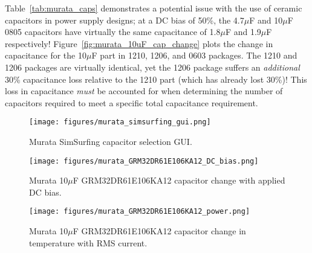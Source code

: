 \documentclass[10pt,twoside]{article}
\begin{document}
Table~\ref{tab:murata_caps} demonstrates a potential issue with the
use of ceramic capacitors in power supply designs; at a DC bias of
50\%, the 4.7$\mu$F and 10$\mu$F 0805 capacitors have virtually the
same capacitance of 1.8$\mu$F and 1.9$\mu$F respectively!
Figure~\ref{fig:murata_10uF_cap_change} plots the change in capacitance
for the 10$\mu$F part in 1210, 1206, and 0603 packages.
The 1210 and 1206 packages are virtually identical, yet the
1206 package suffers an {\em additional} 30\% capacitance
loss relative to the 1210 part (which has already lost 30\%)!
This loss in capacitance {\em must} be accounted for when determining
the number of capacitors required to meet a specific total capacitance
requirement.

%
\begin{figure}[p]
  \begin{center}
    \texttt{[image: figures/murata\_simsurfing\_gui.png]}\\
  \end{center}
  \caption{Murata SimSurfing capacitor selection GUI.}
  \label{fig:murata_simsurfing_cap_selector}
\end{figure}

%
%
\begin{figure}[p]
  \begin{center}
    \texttt{[image: figures/murata\_GRM32DR61E106KA12\_DC\_bias.png]}
  \end{center}
  \caption{Murata 10$\mu$F GRM32DR61E106KA12 capacitor change with applied DC bias.}
  \label{fig:murata_DC_bias}
\end{figure}

\begin{figure}[p]
  \begin{center}
    \texttt{[image: figures/murata\_GRM32DR61E106KA12\_power.png]}
  \end{center}
  \caption{Murata 10$\mu$F GRM32DR61E106KA12 capacitor change in temperature with RMS current.}
  \label{fig:murata_power}
\end{figure}
\end{document}
